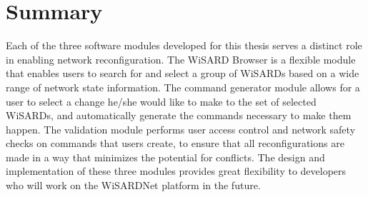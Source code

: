 \section{Summary}
Each of the three software modules developed for this thesis serves a distinct role in enabling network reconfiguration. The WiSARD Browser is a flexible module that enables users to search for and select a group of WiSARDs based on a wide range of network state information. The command generator module allows for a user to select a change he/she would like to make to the set of selected WiSARDs, and automatically generate the commands necessary to make them happen. The validation module performs user access control and network safety checks on commands that users create, to ensure that all reconfigurations are made in a way that minimizes the potential for conflicts. The design and implementation of these three modules provides great flexibility to developers who will work on the WiSARDNet platform in the future.
